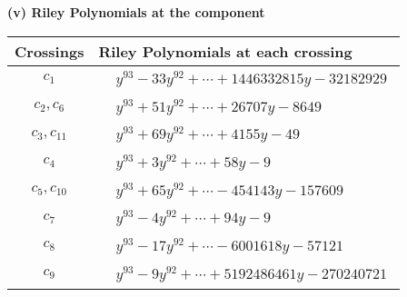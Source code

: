 \documentclass[1p]{elsarticle_modified}
\theoremstyle{definition}
\begin{document}
\newpage\renewcommand{\arraystretch}{1}
\flushleft \textbf{(v) Riley Polynomials at the component}\newline \\
\begin{tabular}{m{50pt}|m{274pt}}
Crossings & \hspace{64pt}Riley Polynomials at each crossing \\
\hline $$\begin{aligned}c_{1}\end{aligned}$$&$\begin{aligned}
&y^{93}-33 y^{92}+\cdots+1446332815 y-32182929
\end{aligned}$\\
\hline $$\begin{aligned}c_{2},c_{6}\end{aligned}$$&$\begin{aligned}
&y^{93}+51 y^{92}+\cdots+26707 y-8649
\end{aligned}$\\
\hline $$\begin{aligned}c_{3},c_{11}\end{aligned}$$&$\begin{aligned}
&y^{93}+69 y^{92}+\cdots+4155 y-49
\end{aligned}$\\
\hline $$\begin{aligned}c_{4}\end{aligned}$$&$\begin{aligned}
&y^{93}+3 y^{92}+\cdots+58 y-9
\end{aligned}$\\
\hline $$\begin{aligned}c_{5},c_{10}\end{aligned}$$&$\begin{aligned}
&y^{93}+65 y^{92}+\cdots-454143 y-157609
\end{aligned}$\\
\hline $$\begin{aligned}c_{7}\end{aligned}$$&$\begin{aligned}
&y^{93}-4 y^{92}+\cdots+94 y-9
\end{aligned}$\\
\hline $$\begin{aligned}c_{8}\end{aligned}$$&$\begin{aligned}
&y^{93}-17 y^{92}+\cdots-6001618 y-57121
\end{aligned}$\\
\hline $$\begin{aligned}c_{9}\end{aligned}$$&$\begin{aligned}
&y^{93}-9 y^{92}+\cdots+5192486461 y-270240721
\end{aligned}$\\
\hline
\end{tabular}\\~\\
\end{document}
